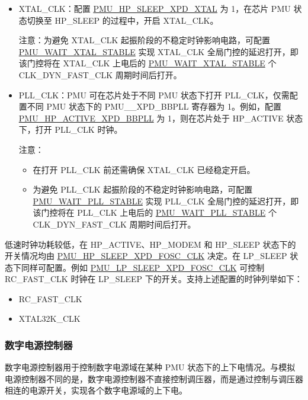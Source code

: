 \documentclass[main\_\_CN.tex]{subfiles}
\begin{document}
\begin{itemize}
    \item XTAL\_CLK：配置 \hyperref[fielddesc:PMUHPSLEEPXPDXTAL]{PMU\_HP\_SLEEP\_XPD\_XTAL} 为 1，在芯片 PMU 状态切换至 HP\_SLEEP 的过程中，开启 XTAL\_CLK。

    注意：为避免 XTAL\_CLK 起振阶段的不稳定时钟影响电路，可配置 \hyperref[fielddesc:PMUWAITXTALSTABLE]{PMU\_WAIT\_XTAL\_STABLE} 实现 XTAL\_CLK 全局门控的延迟打开，即该门控将在 XTAL\_CLK 上电后的 \hyperref[fielddesc:PMUWAITXTALSTABLE]{PMU\_WAIT\_XTAL\_STABLE} 个 CLK\_DYN\_FAST\_CLK 周期时间后打开。

    \item PLL\_CLK：PMU 可在芯片处于不同 PMU 状态下打开 PLL\_CLK，仅需配置不同 PMU 状态下的 PMU\_\_XPD\_BBPLL 寄存器为 1。例如，配置 \hyperref[fielddesc:PMUHPACTIVEXPDBBPLL]{PMU\_HP\_ACTIVE\_XPD\_BBPLL} 为 1，则在芯片处于 HP\_ACTIVE 状态下，打开 PLL\_CLK 时钟。

    注意：
    \begin{itemize}
        \item 在打开 PLL\_CLK 前还需确保 XTAL\_CLK 已经稳定开启。
        \item 为避免 PLL\_CLK 起振阶段的不稳定时钟影响电路，可配置 \hyperref[fielddesc:PMUWAITPLLSTABLE]{PMU\_WAIT\_PLL\_STABLE} 实现 PLL\_CLK 全局门控的延迟打开，即该门控将在 PLL\_CLK 上电后的 \hyperref[fielddesc:PMUWAITPLLSTABLE]{PMU\_WAIT\_PLL\_STABLE} 个CLK\_DYN\_FAST\_CLK 周期时间后打开。
    \end{itemize}
\end{itemize}

低速时钟功耗较低，在 HP\_ACTIVE、HP\_MODEM 和 HP\_SLEEP 状态下的开关情况均由 \hyperref[fielddesc:PMUHPSLEEPXPDFOSCCLK]{PMU\_HP\_SLEEP\_XPD\_FOSC\_CLK} 决定。在 LP\_SLEEP 状态下同样可配置。例如 \hyperref[fielddesc:PMULPSLEEPXPDFOSCCLK]{PMU\_LP\_SLEEP\_XPD\_FOSC\_CLK} 可控制 RC\_FAST\_CLK 时钟在 LP\_SLEEP 下的开关。支持上述配置的时钟列举如下：

\begin{itemize}
\item RC\_FAST\_CLK
\item XTAL32K\_CLK
\end{itemize}

\subsubsection{数字电源控制器}

数字电源控制器用于控制数字电源域在某种 PMU 状态下的上下电情况。与模拟电源控制器不同的是，数字电源控制器不直接控制调压器，而是通过控制与调压器相连的电源开关，实现各个数字电源域的上下电。
\end{document}

